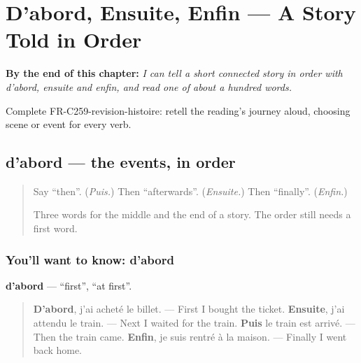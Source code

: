 
\chapter{D'abord, Ensuite, Enfin — A Story Told in Order}
\label{ch:fr-a-story-told-in-order}

\begin{chapteropening}
\textbf{By the end of this chapter:} \emph{I can tell a short connected story in order with d'abord, ensuite and enfin, and read one of about a hundred words.}

Complete FR-C259-revision-histoire: retell the reading's journey aloud, choosing scene or event for every verb.
\end{chapteropening}

\section[d'abord]{d'abord — the events, in order}

\label{lesson:FR-C259-dabord}



\begin{quote}
Say \textquotedblleft{}then\textquotedblright{}. (\emph{Puis.}) Then \textquotedblleft{}afterwards\textquotedblright{}. (\emph{Ensuite.}) Then \textquotedblleft{}finally\textquotedblright{}. (\emph{Enfin.})

Three words for the middle and the end of a story. The order still needs a first word.
\end{quote}

\subsection*{You'll want to know: d'abord}
\textbf{d'abord} — \textquotedblleft{}first\textquotedblright{}, \textquotedblleft{}at first\textquotedblright{}.

\begin{quote}
\textbf{D'abord}, j'ai acheté le billet. — First I bought the ticket. \textbf{Ensuite}, j'ai attendu le train. — Next I waited for the train. \textbf{Puis} le train est arrivé. — Then the train came. \textbf{Enfin}, je suis rentré à la maison. — Finally I went back home.
\end{quote}

